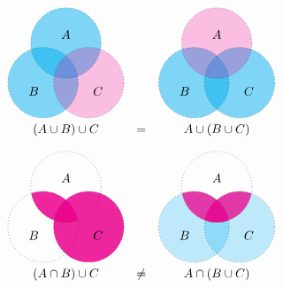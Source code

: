 \begin{itemize}
	\[\begin{array}{ccc}
		\begin{tikzpicture}
			\begin{scope}
				\fill[cyan,opacity=.5] \firstcircle;
				\fill[cyan,opacity=.5] \secondcircle;
			\end{scope}
			\begin{scope}
				\fill[magenta,opacity=.25] \thirdcircle;
			\end{scope}
			\draw[dotted] \firstcircle node[text=black,above] {$A$};
			\draw[dotted] \secondcircle node [text=black,below left] {$B$};
			\draw[dotted] \thirdcircle node [text=black,below right] {$C$};
		\end{tikzpicture}
		&&
		\begin{tikzpicture}
			\begin{scope}
				\fill[cyan,opacity=.5] \secondcircle;
				\fill[cyan,opacity=.5] \thirdcircle;
			\end{scope}
			\begin{scope}
				\fill[magenta,opacity=.25] \firstcircle;
			\end{scope}
			\draw[dotted] \firstcircle node[text=black,above] {$A$};
			\draw[dotted] \secondcircle node [text=black,below left] {$B$};
			\draw[dotted] \thirdcircle node [text=black,below right] {$C$};
		\end{tikzpicture}
		\\
		(A \cup B) \cup C
		&=&
		A \cup (B \cup C)
	\end{array}\]

	\[\begin{array}{ccc}
		\begin{tikzpicture}
			\begin{scope}
				\clip \firstcircle;
				\fill[magenta,opacity=.85] \secondcircle;
			\end{scope}
			\begin{scope}
				\fill[magenta,opacity=.85] \thirdcircle;
			\end{scope}
			\draw[dotted] \firstcircle node[text=black,above] {$A$};
			\draw[dotted] \secondcircle node [text=black,below left] {$B$};
			\draw[dotted] \thirdcircle node [text=black,below right] {$C$};
		\end{tikzpicture}
		&&
		\begin{tikzpicture}
			\begin{scope}
				\fill[cyan,opacity=.25] \secondcircle;
				\fill[cyan,opacity=.25] \thirdcircle;
			\end{scope}
			\begin{scope}
				\clip \firstcircle;
				\fill[magenta,opacity=.75] \secondcircle;
				\fill[magenta,opacity=.75] \thirdcircle;
			\end{scope}
			\draw[dotted] \firstcircle node[text=black,above] {$A$};
			\draw[dotted] \secondcircle node [text=black,below left] {$B$};
			\draw[dotted] \thirdcircle node [text=black,below right] {$C$};
		\end{tikzpicture}
		\\
		(A \cap B) \cup C
		&\neq&
		A \cap (B \cup C)
	\end{array}\]


\end{itemize}
